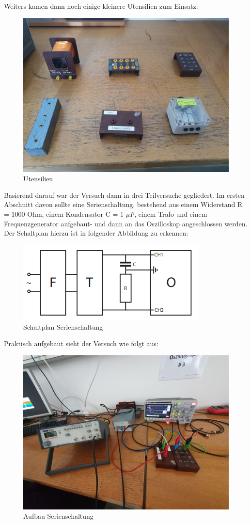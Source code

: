 \documentclass[12pt,a4paper,twoside]{article}
\begin{document}
\noindent
Weiters kamen dann noch einige kleinere Utensilien zum Einsatz:

\begin{figure}[H]
    \centering
    \includegraphics[width=0.6\linewidth, angle=0]{nudes/Utensilien.jpg}
    \caption{Utensilien}
    \label{fig:Utensilien}
\end{figure} 

\noindent
Basierend darauf war der Versuch dann in drei Teilversuche gegliedert. Im ersten Abschnitt davon sollte eine Serienschaltung, bestehend aus einem Widerstand R = 1000 Ohm, einem Kondensator C = 1 $\mu F$, einem Trafo und einem Frequenzgenerator aufgebaut- und dann an das Oszilloskop angeschlossen werden.
Der Schaltplan hierzu ist in folgender Abbildung zu erkennen:

\begin{figure}[H]
    \centering
    \includegraphics[width=0.6\linewidth, angle=0]{nudes/3.2 Schaltplan.png}
    \caption{Schaltplan Serienschaltung}
    \label{fig:Schaltplan Serienschaltung}
\end{figure}

\noindent
Praktisch aufgebaut sieht der Versuch wie folgt aus:

\begin{figure}[H]
    \centering
    \includegraphics[width=0.6\linewidth, angle=0]{nudes/Aufbau Serienschaltung.jpg}
    \caption{Aufbau Serienschaltung}
    \label{fig:Aufbau Serienschaltung}
\end{figure} 
\end{document}
